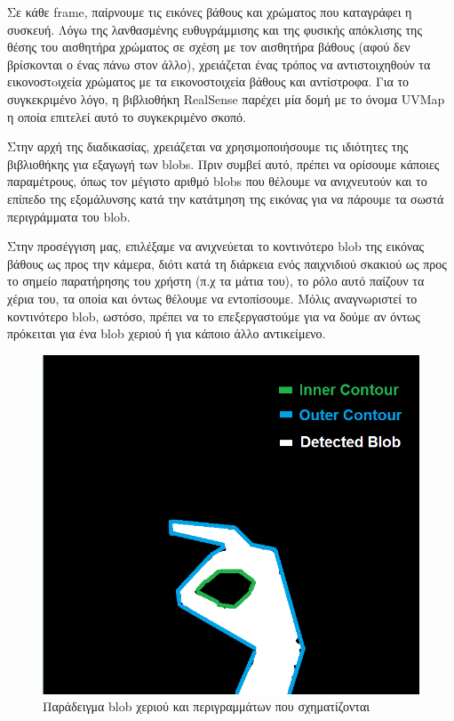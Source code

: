Σε κάθε frame, παίρνουμε τις εικόνες βάθους και χρώματος που καταγράφει η συσκευή. Λόγω της λανθασμένης ευθυγράμμισης και της φυσικής απόκλισης της θέσης του αισθητήρα χρώματος σε σχέση με τον αισθητήρα βάθους (αφού δεν βρίσκονται ο ένας πάνω στον άλλο), χρειάζεται ένας τρόπος να αντιστοιχηθούν τα εικονοστoιχεία χρώματος με τα εικονοστοιχεία βάθους και αντίστροφα. Για το συγκεκριμένο λόγο, η βιβλιοθήκη RealSense παρέχει μία δομή με το όνομα UVMap η οποία επιτελεί αυτό το συγκεκριμένο σκοπό.

Στην αρχή της διαδικασίας, χρειάζεται να χρησιμοποιήσουμε τις ιδιότητες της βιβλιοθήκης για εξαγωγή των blobs. Πριν συμβεί αυτό, πρέπει να ορίσουμε κάποιες παραμέτρους, όπως τον μέγιστο αριθμό blobs που θέλουμε να ανιχνευτούν και το επίπεδο της εξομάλυνσης κατά την κατάτμηση της εικόνας για να πάρουμε τα σωστά περιγράμματα του blob. 

Στην προσέγγιση μας, επιλέξαμε να ανιχνεύεται το κοντινότερο blob της εικόνας βάθους ως προς την κάμερα, διότι κατά τη διάρκεια ενός παιχνιδιού σκακιού ως προς το σημείο παρατήρησης του χρήστη (π.χ τα μάτια του), το ρόλο αυτό παίζουν τα χέρια του, τα οποία και όντως θέλουμε να εντοπίσουμε. Μόλις αναγνωριστεί το κοντινότερο blob, ωστόσο, πρέπει να το επεξεργαστούμε για να δούμε αν όντως πρόκειται για ένα blob χεριού ή για κάποιο άλλο αντικείμενο.


\begin{figure}[H]
    \centering
    \includegraphics[scale=0.7, angle=0]{Files/Figures/2.png}
    \caption[Παράδειγμα blob χεριού και περιγραμμάτων που σχηματίζονται]{Παράδειγμα blob χεριού και περιγραμμάτων που σχηματίζονται}
    \label{fig:hand_blob}
\end{figure}



